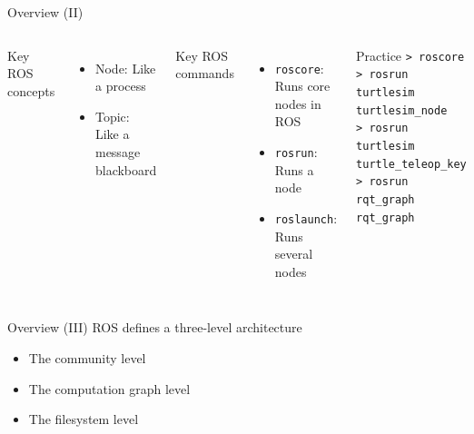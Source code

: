 \documentclass[10pt,compress]{beamer} %
\begin{document}
\begin{frame}{Overview (II)}
    \begin{columns}
		Key ROS concepts

 	 	\begin{itemize}
		\item Node: Like a process
		\item Topic: Like a message blackboard
		\end{itemize}

		Key ROS commands
 	 	\begin{itemize}
		\item \texttt{roscore}: Runs core nodes in ROS
		\item \texttt{rosrun}: Runs a node
		\item \texttt{roslaunch}: Runs several nodes
		\end{itemize}

	   \begin{block}{Practice}
	   \small{
	   \texttt{> roscore}\\
	   \texttt{> rosrun turtlesim turtlesim\_node}\\
	   \texttt{> rosrun turtlesim turtle\_teleop\_key}\\
	   \texttt{> rosrun rqt\_graph rqt\_graph}\\
	   }
	   \end{block}
	   \bigskip
		\centering\includegraphics[width=\linewidth]{figs/captura2.png}\\
		\bigskip
		\centering\includegraphics[width=\linewidth]{figs/captura1.png}
	\end{columns}
\end{frame}

\begin{frame}{Overview (III)}
	ROS defines a three-level architecture
	\begin{itemize}
		\item The community level
		\item The computation graph level
		\item The filesystem level
  	\end{itemize}
\end{frame}
\end{document}
